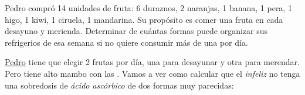 \def\Pedro{\href{https://www.youtube.com/watch?v=RXKabdUBiWM}{Pedro}\xspace}

\begin{enunciado}{\ejercicio}
  Pedro compró 14 unidades de fruta: 6 duraznos, 2 naranjas, 1 banana, 1 pera, 1 higo, 1 kiwi, 1 ciruela, 1 mandarina.
  Su propósito es comer una fruta en cada desayuno y merienda. Determinar de cuántas formas puede organizar sus refrigerios de
  esa semana si no quiere consumir más de una  por día.
\end{enunciado}

\Pedro tiene que elegir 2 frutas por día, una para desayunar y otra para merendar.
Pero tiene alto mambo con las . Vamos a ver como calcular que el \textit{infeliz} no tenga una sobredosis de
\textit{ácido ascórbico} de dos formas muy parecidas:


